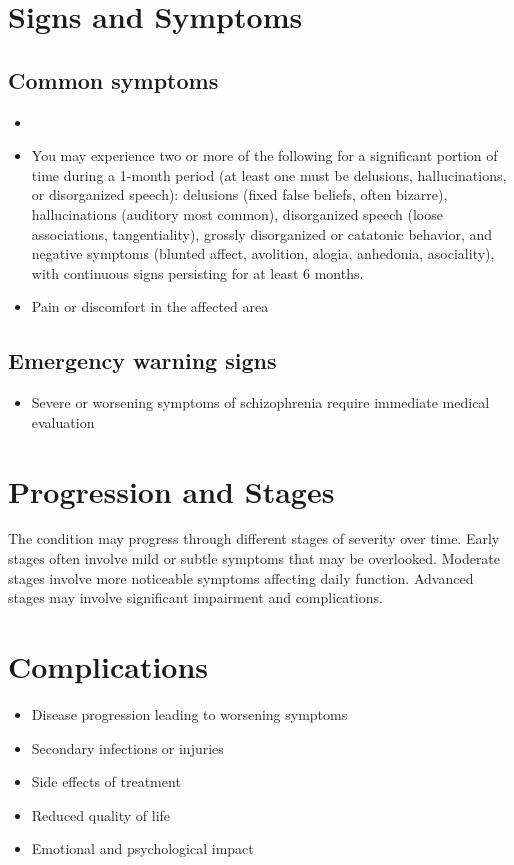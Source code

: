 \section{Signs and Symptoms}
\subsection{Common symptoms}
\begin{itemize}[noitemsep]
  \item \item You may experience two or more of the following for a significant portion of time during a 1-month period (at least one must be delusions, hallucinations, or disorganized speech): delusions (fixed false beliefs, often bizarre), hallucinations (auditory most common), disorganized speech (loose associations, tangentiality), grossly disorganized or catatonic behavior, and negative symptoms (blunted affect, avolition, alogia, anhedonia, asociality), with continuous signs persisting for at least 6 months.
  \item Pain or discomfort in the affected area
  \end{itemize}
\subsection{Emergency warning signs}
\begin{itemize}[noitemsep]
  \item Severe or worsening symptoms of schizophrenia require immediate medical evaluation
\end{itemize}
\section{Progression and Stages}
The condition may progress through different stages of severity over time. Early stages often involve mild or subtle symptoms that may be overlooked. Moderate stages involve more noticeable symptoms affecting daily function. Advanced stages may involve significant impairment and complications.
\section{Complications}
\begin{itemize}[noitemsep]
  \item Disease progression leading to worsening symptoms
  \item Secondary infections or injuries
  \item Side effects of treatment
  \item Reduced quality of life
  \item Emotional and psychological impact
\end{itemize}
